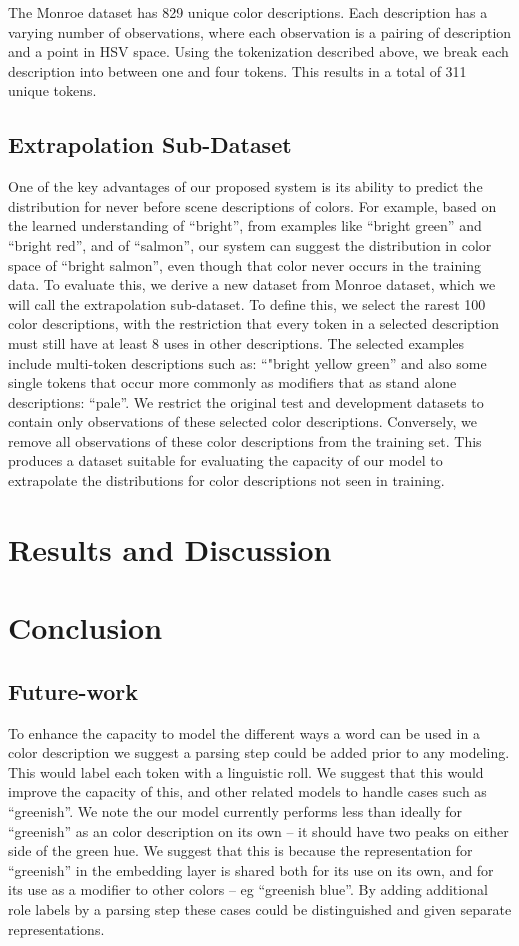 \documentclass[11pt,letterpaper]{article}
\begin{document}
The Monroe dataset has 829 unique color descriptions.
Each description has a varying number of observations, where each observation is a pairing of description and a point in HSV space.
Using the tokenization described above, we break each description into between one and four tokens.
This results in a total of 311 unique tokens.

\subsection{Extrapolation Sub-Dataset}
One of the key advantages of our proposed system is its ability to predict the distribution for never before scene descriptions of colors.
For example, based on the learned understanding of ``bright'', from examples like ``bright green'' and ``bright red'', and of ``salmon'', our system can suggest the distribution in color space of ``bright salmon'', even though that color never occurs in the training data.
To evaluate this, we derive a new dataset from Monroe dataset, which we will call the extrapolation sub-dataset.
To define this, we select the rarest 100 color descriptions,
with the restriction that every token in a selected description must still have at least 8 uses in other descriptions.
The selected examples include multi-token descriptions such as: ``"bright yellow green'' and also some single tokens that occur more commonly as modifiers that as stand alone descriptions: ``pale''.
We restrict the original test and development datasets to contain only observations of these selected color descriptions.
Conversely, we remove all observations of these color descriptions from the training set.
This produces a dataset suitable for evaluating the capacity of our model to extrapolate the distributions for color descriptions not seen in training.




\section{Results and Discussion}
\section{Conclusion}


\subsection{Future-work}
To enhance the capacity to model the different ways a word can be used in a color description we suggest a parsing step could be added prior to any modeling.
This would label each token with a linguistic roll.
We suggest that this would improve the capacity of this, and other related models to handle cases such as ``greenish''.
We note the our model currently performs less than ideally for ``greenish'' as an color description on its own -- it should have two peaks on either side of the green hue.
We suggest that this is because the representation for ``greenish'' in the embedding layer is shared both for its use on its own, and for its use as a modifier to other colors -- eg ``greenish blue''.
By adding additional role labels by a parsing step these cases could be distinguished and given separate representations.
\end{document}
